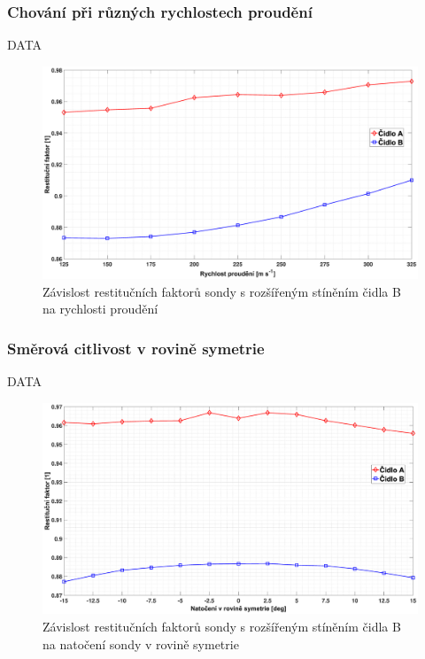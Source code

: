         \subsubsection{Chování při různých rychlostech proudění}
            DATA
            
            \begin{figure}[ht!]
                \centering
                \includegraphics*[width=\textwidth, trim={5.9cm 1.0cm 5.8cm 2.0cm}]{400_SIMULACE_KONSTRUKCNICH_UPRAV/Grafy/03_rychlosti.eps}
                \caption{Závislost restitučních faktorů sondy s rozšířeným stíněním čidla B na rychlosti proudění}
                \label{fig:sonda-s-rosirenym-stinenim-rychlosti}
            \end{figure}
        \subsubsection{Směrová citlivost v rovině symetrie}
            DATA
            
            \begin{figure}[ht!]
                \centering
                \includegraphics*[width=\textwidth, trim={5.9cm 1.0cm 5.8cm 2.0cm}]{400_SIMULACE_KONSTRUKCNICH_UPRAV/Grafy/03_rovina_symetrie}
                \caption{Závislost restitučních faktorů sondy s rozšířeným stíněním čidla B na natočení sondy v rovině symetrie}
                \label{fig:sonda-s-rosirenym-stinenim-rovina-symetrie}
            \end{figure}
